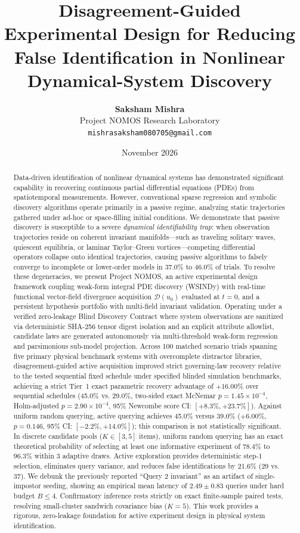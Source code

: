 \documentclass[twocolumn,10pt,a4paper]{article}
\title{\textbf{Disagreement-Guided Experimental Design for Reducing False Identification in Nonlinear Dynamical-System Discovery}}
\author{
    \textbf{Saksham Mishra} \\
    Project NOMOS Research Laboratory \\
    \texttt{mishrasaksham080705@gmail.com}
}
\date{November 2026}
\begin{document}
\maketitle

\begin{abstract}
Data-driven identification of nonlinear dynamical systems has demonstrated significant capability in recovering continuous partial differential equations (PDEs) from spatiotemporal measurements. However, conventional sparse regression and symbolic discovery algorithms operate primarily in a passive regime, analyzing static trajectories gathered under ad-hoc or space-filling initial conditions. We demonstrate that passive discovery is susceptible to a severe \emph{dynamical identifiability trap}: when observation trajectories reside on coherent invariant manifolds---such as traveling solitary waves, quiescent equilibria, or laminar Taylor--Green vortices---competing differential operators collapse onto identical trajectories, causing passive algorithms to falsely converge to incomplete or lower-order models in $37.0\%$ to $46.0\%$ of trials. To resolve these degeneracies, we present Project NOMOS, an active experimental design framework coupling weak-form integral PDE discovery (WSINDy) with real-time functional vector-field divergence acquisition $\mathcal{D}(u_0)$ evaluated at $t=0$, and a persistent hypothesis portfolio with multi-field invariant validation. Operating under a verified zero-leakage Blind Discovery Contract where system observations are sanitized via deterministic SHA-256 tensor digest isolation and an explicit attribute allowlist, candidate laws are generated autonomously via multi-threshold weak-form regression and parsimonious sub-model projection. Across 100 matched scenario trials spanning five primary physical benchmark systems with overcomplete distractor libraries, disagreement-guided active acquisition improved strict governing-law recovery relative to the tested sequential fixed schedule under specified blinded simulation benchmarks, achieving a strict Tier~1 exact parametric recovery advantage of $+16.00\%$ over sequential schedules (45.0\% vs. 29.0\%, two-sided exact McNemar $p = 1.45 \times 10^{-4}$, Holm-adjusted $p = 2.90 \times 10^{-4}$, 95\% Newcombe score CI: $[+8.3\%, +23.7\%]$). Against uniform random querying, active querying achieves 45.0\% versus 39.0\% ($+6.00\%$, $p = 0.146$, 95\% CI: $[-2.2\%, +14.0\%]$); this comparison is not statistically significant. In discrete candidate pools ($K \in [3, 5]$ items), uniform random querying has an exact theoretical probability of selecting at least one informative experiment of $78.4\%$ to $96.3\%$ within 3 adaptive draws. Active exploration provides deterministic step-1 selection, eliminates query variance, and reduces false identifications by 21.6\% (29 vs. 37). We debunk the previously reported ``Query 2 invariant'' as an artifact of single-impostor seeding, showing an empirical mean latency of $2.49 \pm 0.83$ queries under hard budget $B \le 4$. Confirmatory inference rests strictly on exact finite-sample paired tests, resolving small-cluster sandwich covariance bias ($K=5$). This work provides a rigorous, zero-leakage foundation for active experiment design in physical system identification.
\end{abstract}
\end{document}
